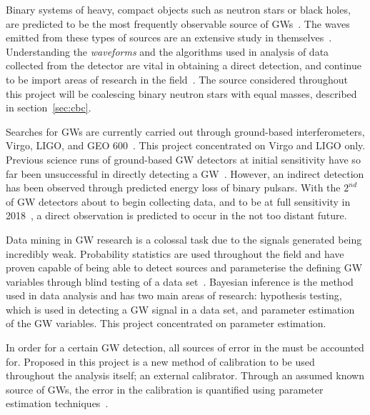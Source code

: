 \documentclass{jpconf}
\begin{document}
Binary systems of heavy, compact objects such as neutron stars or black holes, are predicted to be the most frequently observable source of GWs~\cite{JVei}. The waves emitted from these types of sources are an extensive study in themselves~\cite{peadvanced}. Understanding the \textit{waveforms} and the algorithms used in analysis of data collected from the detector are vital in obtaining a direct detection, and continue to be import areas of research in the field~\cite{pN,TF2}. The source considered throughout this project will be coalescing binary neutron stars with equal masses, described in section~\ref{sec:cbc}. 


Searches for GWs are currently carried out through ground-based interferometers, Virgo, LIGO, and GEO 600~\cite{barish,virgo,geo}. This project concentrated on Virgo and LIGO only. Previous science runs of ground-based GW detectors at initial sensitivity have so far been unsuccessful in directly detecting a GW~\cite{nodetect}. However, an indirect detection has been observed through predicted energy loss of binary pulsars. With the $2^{nd}$ of GW detectors about to begin collecting data, and to be at full sensitivity in 2018~\cite{Harry}, a direct observation is predicted to occur in the not too distant future. 




Data mining in GW research is a colossal task due to the signals generated being incredibly weak. Probability statistics are used throughout the field and have proven capable of being able to detect sources and parameterise the defining GW variables through blind testing of a data set~\cite{blind}. Bayesian inference is the method used in data analysis and has two main areas of research: hypothesis testing, which is used in detecting a GW signal in a data set, and parameter estimation of the GW variables. This project concentrated on parameter estimation.

In order for a certain GW detection, all sources of error in the must be accounted for. Proposed in this project is a new method of calibration to be used throughout the analysis itself; an external calibrator. Through an assumed known source of GWs, the error in the calibration is quantified using parameter estimation techniques~\cite{JVei}.


\end{document}
